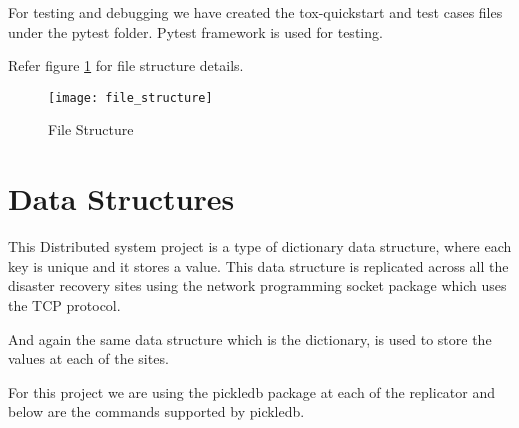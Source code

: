 For testing and debugging we have created the tox-quickstart and test cases files under the pytest folder. Pytest framework is used for testing. 

Refer figure \ref{fig:24} for file structure details. 

\begin{figure}[h]
    \centering
    \texttt{[image: file\_structure]}
    \caption{File Structure}
    \label{fig:24}
\end{figure}

\section{Data Structures}

This Distributed system project is a type of dictionary data structure, where each key is unique and it stores a value. This data structure is replicated across all the disaster recovery sites using the network programming socket package which uses the TCP protocol. 

And again the same data structure which is the dictionary, is used to store the values at each of the sites. 

For this project we are using the pickledb package at each of the replicator and below are the commands supported by pickledb.


